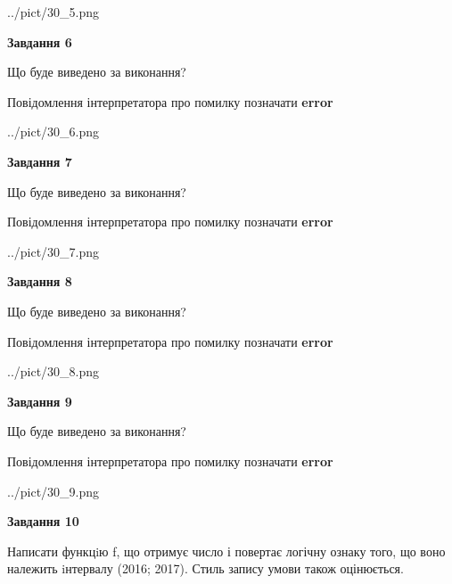 \documentclass[12pt, ukrainian]{article}
\begin{document}
{\begin {large}
\begin{center}
	{../pict/30_5.png}
\end{center}
\newpage

{\begin {center}\textbf{Завдання 6}\end {center}}\par
Що буде виведено за виконання? \par
Повідомлення інтерпретатора про помилку позначати \textbf{error}

\begin{center}
	{../pict/30_6.png}
\end{center}
\newpage

{\begin {center}\textbf{Завдання 7}\end {center}}\par
Що буде виведено за виконання? \par
Повідомлення інтерпретатора про помилку позначати \textbf{error}

\begin{center}
	{../pict/30_7.png}
\end{center}
\newpage

{\begin {center}\textbf{Завдання 8}\end {center}}\par
Що буде виведено за виконання? \par
Повідомлення інтерпретатора про помилку позначати \textbf{error}

\begin{center}
	{../pict/30_8.png}
\end{center}
\newpage

{\begin {center}\textbf{Завдання 9}\end {center}}\par
Що буде виведено за виконання? \par
Повідомлення інтерпретатора про помилку позначати \textbf{error}

\begin{center}
	{../pict/30_9.png}
\end{center}
\newpage

{\begin {center}\textbf{Завдання 10}\end {center}}\par

Написати функцiю f, що отримує число і повертає логічну ознаку того, що воно належить iнтервалу (2016; 2017). Стиль запису умови також оцінюється.\par
\newpage

\end {large}}
\end{document}
